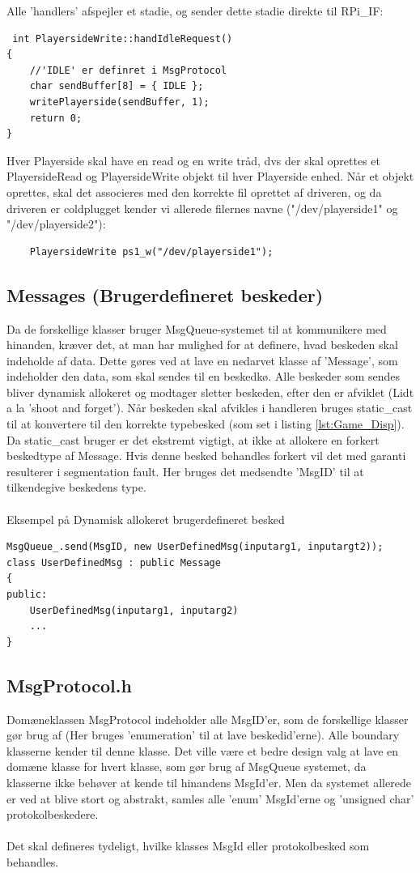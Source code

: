 \documentclass[Softwaredesign/Softwaredesign_main.tex]{subfiles}
\begin{document}
Alle 'handlers' afspejler et stadie, og sender dette stadie direkte til RPi\_IF: 
\begin{lstlisting}
 int PlayersideWrite::handIdleRequest()
{
    //'IDLE' er definret i MsgProtocol 
	char sendBuffer[8] = { IDLE };
	writePlayerside(sendBuffer, 1);
	return 0;
}
\end{lstlisting}
Hver Playerside skal have en read og en write tråd, dvs der skal oprettes et PlayersideRead og PlayersideWrite objekt til hver Playerside enhed. Når et objekt oprettes, skal det associeres med den korrekte fil oprettet af driveren, og da driveren er coldplugget kender vi allerede filernes navne ("/dev/playerside1" og "/dev/playerside2"): 
\begin{lstlisting}
    PlayersideWrite ps1_w("/dev/playerside1");
\end{lstlisting}
\subsection{Messages (Brugerdefineret beskeder)}
Da de forskellige klasser bruger MsgQueue-systemet til at kommunikere med hinanden, kræver det, at man har mulighed for at definere, hvad beskeden skal indeholde af data. Dette gøres ved at lave en nedarvet klasse af 'Message', som indeholder den data, som skal sendes til en beskedkø. Alle beskeder som sendes bliver dynamisk allokeret og modtager sletter beskeden, efter den er afviklet (Lidt a la 'shoot and forget'). Når beskeden skal afvikles i handleren bruges static\_cast til at konvertere til den korrekte typebesked (som set i listing \ref{lst:Game_Disp}). Da static\_cast bruger er det ekstremt vigtigt, at ikke at allokere en forkert beskedtype af Message. Hvis denne besked behandles forkert vil det med garanti resulterer i segmentation fault. Her bruges det medsendte 'MsgID' til at tilkendegive beskedens type. \\\\
Eksempel på Dynamisk allokeret brugerdefineret besked
\begin{lstlisting}
MsgQueue_.send(MsgID, new UserDefinedMsg(inputarg1, inputargt2));
class UserDefinedMsg : public Message
{
public:
    UserDefinedMsg(inputarg1, inputarg2)
    ...
}
\end{lstlisting}
\subsection{MsgProtocol.h}
Domæneklassen MsgProtocol indeholder alle MsgID'er, som de forskellige klasser gør brug af (Her bruges 'enumeration' til at lave beskedid'erne). Alle boundary klasserne kender til denne klasse. Det ville være et bedre design valg at lave en domæne klasse for hvert klasse, som gør brug af MsgQueue systemet, da klasserne ikke behøver at kende til hinandens MsgId'er. Men da systemet allerede er ved at blive stort og abstrakt, samles alle 'enum' MsgId'erne og 'unsigned char' protokolbeskedere. \\\\
Det skal defineres tydeligt, hvilke klasses MsgId eller protokolbesked som behandles.
\end{document}
